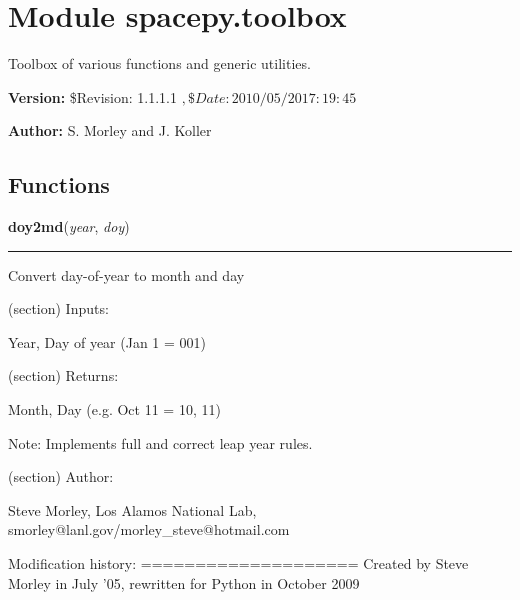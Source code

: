 %
%
%


\section{Module spacepy.toolbox}

    \label{spacepy:toolbox}
Toolbox of various functions and generic utilities.

\textbf{Version:} \$Revision: 1.1.1.1 $, \$Date: 2010/05/20 17:19:45 $



\textbf{Author:} S. Morley and J. Koller





  \subsection{Functions}

    \label{spacepy:toolbox:doy2md}

    \vspace{0.5ex}

\hspace{.8\funcindent}\begin{boxedminipage}{\funcwidth}

    \raggedright \textbf{doy2md}(\textit{year}, \textit{doy})

    \vspace{-1.5ex}

    \rule{\textwidth}{0.5\fboxrule}
\setlength{\parskip}{2ex}
    Convert day-of-year to month and day

    (section) Inputs:

      Year, Day of year (Jan 1 = 001)

    (section) Returns:

      Month, Day (e.g. Oct 11 = 10, 11)

      Note: Implements full and correct leap year rules.

    (section) Author:

      Steve Morley, Los Alamos National Lab, 
      smorley@lanl.gov/morley\_steve@hotmail.com

      Modification history: ==================== Created by Steve Morley in
      July '05, rewritten for Python in October 2009

\setlength{\parskip}{1ex}
    \end{boxedminipage}

